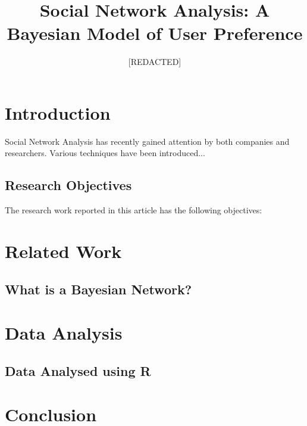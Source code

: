 \documentclass{report}
\title{Social Network Analysis: A Bayesian Model of User Preference}
\author{[REDACTED]}
\date{}
\begin{document}
\tableofcontents

\maketitle
{}

\section{Introduction}
Social Network Analysis has recently gained attention by both companies and researchers. Various techniques have been introduced...

\subsection{Research Objectives}
The research work reported in this article has the following objectives:

\section{Related Work}

\subsection{What is a Bayesian Network?}

\section{Data Analysis}

\subsection{Data Analysed using R}

\section{Conclusion}
\end{document}

